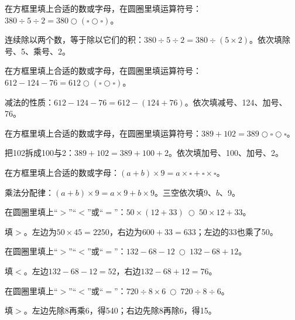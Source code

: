 在方框里填上合适的数或字母，在圆圈里填运算符号：\(380\div5\div2=380\bigcirc(\square\bigcirc\square)\)。\par
\begin{BookAnswer}
连续除以两个数，等于除以它们的积：\(380\div5\div2=380\div(5\times2)\)。依次填除号、5、乘号、2。
\end{BookAnswer}

在方框里填上合适的数或字母，在圆圈里填运算符号：\(612-124-76=612\bigcirc(\square\bigcirc\square)\)。\par
\begin{BookAnswer}
减法的性质：\(612-124-76=612-(124+76)\)。依次填减号、124、加号、76。
\end{BookAnswer}

在方框里填上合适的数或字母，在圆圈里填运算符号：\(389+102=389\bigcirc\square\bigcirc\square\)。\par
\begin{BookAnswer}
把102拆成100与2：\(389+102=389+100+2\)。依次填加号、100、加号、2。
\end{BookAnswer}

在方框里填上合适的数或字母：\((a+b)\times9=a\times\square+\square\times\square\)。\par
\begin{BookAnswer}
乘法分配律：\((a+b)\times9=a\times9+b\times9\)。三空依次填9、\(b\)、9。
\end{BookAnswer}

在圆圈里填上“\(>\)”“\(<\)”或“\(=\)”：\(50\times(12+33)\ \bigcirc\ 50\times12+33\)。\par
\begin{BookAnswer}
填\(>\)。左边为\(50\times45=2250\)，右边为\(600+33=633\)；左边的33也乘了50。
\end{BookAnswer}

在圆圈里填上“\(>\)”“\(<\)”或“\(=\)”：\(132-68-12\ \bigcirc\ 132-68+12\)。\par
\begin{BookAnswer}
填\(<\)。左边\(132-68-12=52\)，右边\(132-68+12=76\)。
\end{BookAnswer}

在圆圈里填上“\(>\)”“\(<\)”或“\(=\)”：\(720\div8\times6\ \bigcirc\ 720\div8\div6\)。\par
\begin{BookAnswer}
填\(>\)。左边先除8再乘6，得540；右边先除8再除6，得15。
\end{BookAnswer}

